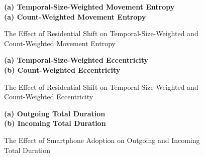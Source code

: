 \begin{figure}[ht!]
\centering
\caption{The Effect of Residential Shift on Temporal-Size-Weighted and Count-Weighted Movement Entropy}
\vspace{0.3cm}

\textbf{(a) Temporal-Size-Weighted Movement Entropy}\\


\vspace{0.3cm}
\textbf{(a) Count-Weighted Movement Entropy}\\


\label{fig:effect_of_residential_shift_on_temporal_size_weighted_count_weighted_movement_entropy}
\end{figure}


\begin{figure}[ht!]
\centering
\caption{The Effect of Residential Shift on Temporal-Size-Weighted and Count-Weighted Eccentricity}
\vspace{0.3cm}

\textbf{(a) Temporal-Size-Weighted Eccentricity}\\


\vspace{0.3cm}
\textbf{(b) Count-Weighted Eccentricity}\\


\label{fig:effect_of_residential_shift_on_temporal_size_weighted_count_weighted_eccentricity}
\end{figure}


\begin{figure}[ht!]
\centering
\caption{The Effect of Smartphone Adoption on Outgoing and Incoming Total Duration}
\vspace{0.3cm}

\textbf{(a) Outgoing Total Duration}\\


\vspace{0.3cm}
\textbf{(b) Incoming Total Duration}\\


\label{fig:effect_of_smartphone_adoption_on_outgoing_incoming_total_duration}
\end{figure}


